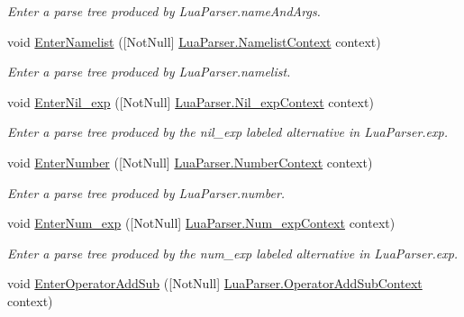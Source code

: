 \begin{DoxyCompactItemize}
\begin{DoxyCompactList}\small\item\em Enter a parse tree produced by Lua\+Parser.\+name\+And\+Args. \end{DoxyCompactList}\item 
void \mbox{\hyperlink{classzlua_1_1_compiler_a2a5054c21e462c7c373154ea435db694}{Enter\+Namelist}} (\mbox{[}Not\+Null\mbox{]} \mbox{\hyperlink{classzlua_1_1_lua_parser_1_1_namelist_context}{Lua\+Parser.\+Namelist\+Context}} context)
\begin{DoxyCompactList}\small\item\em Enter a parse tree produced by Lua\+Parser.\+namelist. \end{DoxyCompactList}\item 
void \mbox{\hyperlink{classzlua_1_1_compiler_a311aa04e7e5d26fae07d698a436dab6d}{Enter\+Nil\+\_\+exp}} (\mbox{[}Not\+Null\mbox{]} \mbox{\hyperlink{classzlua_1_1_lua_parser_1_1_nil__exp_context}{Lua\+Parser.\+Nil\+\_\+exp\+Context}} context)
\begin{DoxyCompactList}\small\item\em Enter a parse tree produced by the {\ttfamily nil\+\_\+exp} labeled alternative in Lua\+Parser.\+exp. \end{DoxyCompactList}\item 
void \mbox{\hyperlink{classzlua_1_1_compiler_a1bbda8fe66a0e085fa7b659d1690cda8}{Enter\+Number}} (\mbox{[}Not\+Null\mbox{]} \mbox{\hyperlink{classzlua_1_1_lua_parser_1_1_number_context}{Lua\+Parser.\+Number\+Context}} context)
\begin{DoxyCompactList}\small\item\em Enter a parse tree produced by Lua\+Parser.\+number. \end{DoxyCompactList}\item 
void \mbox{\hyperlink{classzlua_1_1_compiler_a8ef740c20e6771534630c1c897f0f2f4}{Enter\+Num\+\_\+exp}} (\mbox{[}Not\+Null\mbox{]} \mbox{\hyperlink{classzlua_1_1_lua_parser_1_1_num__exp_context}{Lua\+Parser.\+Num\+\_\+exp\+Context}} context)
\begin{DoxyCompactList}\small\item\em Enter a parse tree produced by the {\ttfamily num\+\_\+exp} labeled alternative in Lua\+Parser.\+exp. \end{DoxyCompactList}\item 
void \mbox{\hyperlink{classzlua_1_1_compiler_ad766e6d486cd81a33eca68f94ed7fb79}{Enter\+Operator\+Add\+Sub}} (\mbox{[}Not\+Null\mbox{]} \mbox{\hyperlink{classzlua_1_1_lua_parser_1_1_operator_add_sub_context}{Lua\+Parser.\+Operator\+Add\+Sub\+Context}} context)

\end{DoxyCompactItemize}
